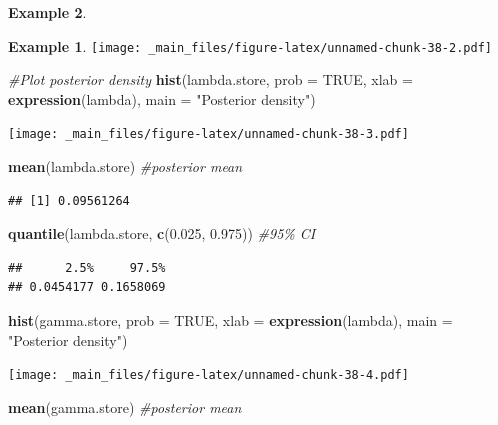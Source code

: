 \documentclass[
]{book}
\newenvironment{Shaded}{\begin{snugshade}}{\end{snugshade}}
\newcommand{\AttributeTok}[1]{\textcolor[rgb]{0.13,0.29,0.53}{#1}}
\newcommand{\CommentTok}[1]{\textcolor[rgb]{0.56,0.35,0.01}{\textit{#1}}}
\newcommand{\ConstantTok}[1]{\textcolor[rgb]{0.56,0.35,0.01}{#1}}
\newcommand{\FloatTok}[1]{\textcolor[rgb]{0.00,0.00,0.81}{#1}}
\newcommand{\FunctionTok}[1]{\textcolor[rgb]{0.13,0.29,0.53}{\textbf{#1}}}
\newcommand{\NormalTok}[1]{#1}
\newcommand{\StringTok}[1]{\textcolor[rgb]{0.31,0.60,0.02}{#1}}
\theoremstyle{definition}
\theoremstyle{definition}
\newtheorem{example}{Example}[chapter]
\theoremstyle{definition}
\theoremstyle{definition}
\theoremstyle{remark}
\begin{document}
\begin{example}
\begin{example}
\texttt{[image: \_main\_files/figure-latex/unnamed-chunk-38-2.pdf]}

\begin{Shaded}
\begin{Highlighting}[]
\CommentTok{\#Plot posterior density}
\FunctionTok{hist}\NormalTok{(lambda.store, }\AttributeTok{prob =} \ConstantTok{TRUE}\NormalTok{, }\AttributeTok{xlab =} \FunctionTok{expression}\NormalTok{(lambda), }\AttributeTok{main =} \StringTok{"Posterior density"}\NormalTok{)}
\end{Highlighting}
\end{Shaded}

\texttt{[image: \_main\_files/figure-latex/unnamed-chunk-38-3.pdf]}

\begin{Shaded}
\begin{Highlighting}[]
\FunctionTok{mean}\NormalTok{(lambda.store) }\CommentTok{\#posterior mean}
\end{Highlighting}
\end{Shaded}

\begin{verbatim}
## [1] 0.09561264
\end{verbatim}

\begin{Shaded}
\begin{Highlighting}[]
\FunctionTok{quantile}\NormalTok{(lambda.store, }\FunctionTok{c}\NormalTok{(}\FloatTok{0.025}\NormalTok{, }\FloatTok{0.975}\NormalTok{)) }\CommentTok{\#95\% CI}
\end{Highlighting}
\end{Shaded}

\begin{verbatim}
##      2.5%     97.5% 
## 0.0454177 0.1658069
\end{verbatim}

\begin{Shaded}
\begin{Highlighting}[]
\FunctionTok{hist}\NormalTok{(gamma.store, }\AttributeTok{prob =} \ConstantTok{TRUE}\NormalTok{, }\AttributeTok{xlab =} \FunctionTok{expression}\NormalTok{(lambda), }\AttributeTok{main =} \StringTok{"Posterior density"}\NormalTok{)}
\end{Highlighting}
\end{Shaded}

\texttt{[image: \_main\_files/figure-latex/unnamed-chunk-38-4.pdf]}

\begin{Shaded}
\begin{Highlighting}[]
\FunctionTok{mean}\NormalTok{(gamma.store) }\CommentTok{\#posterior mean}
\end{Highlighting}
\end{Shaded}


\end{example}
\end{example}
\end{document}
